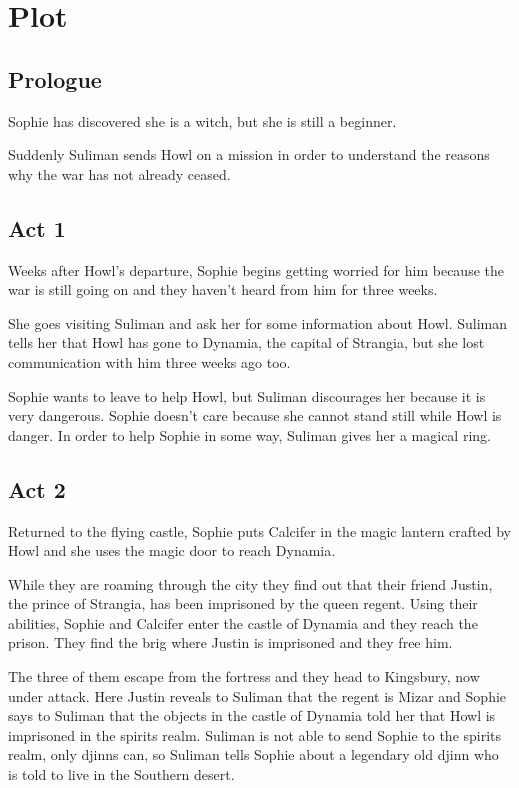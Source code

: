 \section{Plot}

\subsection*{Prologue}
Sophie has discovered she is a witch, but she is still a beginner.

Suddenly Suliman sends Howl on a mission in order to understand the reasons why the war has not already ceased.

\subsection*{Act 1}
Weeks after Howl's departure, Sophie begins getting worried for him because the war is still going on and they haven't heard from him for three weeks.

She goes visiting Suliman and ask her for some information about Howl. Suliman tells her that Howl has gone to Dynamia, the capital of Strangia, but she lost communication with him three weeks ago too.

Sophie wants to leave to help Howl, but Suliman discourages her because it is very dangerous. Sophie doesn't care because she cannot stand still while Howl is danger. In order to help Sophie in some way, Suliman gives her a magical ring.

\subsection*{Act 2}
Returned to the flying castle, Sophie puts Calcifer in the magic lantern crafted by Howl and she uses the magic door to reach Dynamia.

While they are roaming through the city they find out that their friend Justin, the prince of Strangia, has been imprisoned by the queen regent. Using their abilities, Sophie and Calcifer enter the castle of Dynamia and they reach the prison. They find the brig where Justin is imprisoned and they free him.

The three of them escape from the fortress and they head to Kingsbury, now under attack. Here Justin reveals to Suliman that the regent is Mizar and Sophie says to Suliman that the objects in the castle of Dynamia told her that Howl is imprisoned in the spirits realm. Suliman is not able to send Sophie to the spirits realm, only djinns can, so Suliman tells Sophie about a legendary old djinn who is told to live in the Southern desert.

